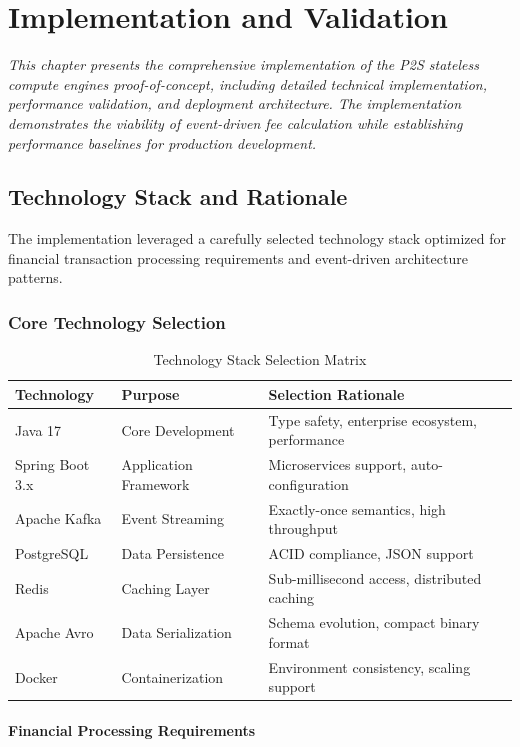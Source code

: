 \chapter{Implementation and Validation}
\textit{This chapter presents the comprehensive implementation of the P2S stateless compute engines proof-of-concept, including detailed technical implementation, performance validation, and deployment architecture. The implementation demonstrates the viability of event-driven fee calculation while establishing performance baselines for production development.}
\pagebreak

\section{Technology Stack and Rationale}

The implementation leveraged a carefully selected technology stack optimized for financial transaction processing requirements and event-driven architecture patterns.

\subsection{Core Technology Selection}

\begin{table}[h]
\centering
\begin{tabular}{|l|l|l|}
\hline
\textbf{Technology} & \textbf{Purpose} & \textbf{Selection Rationale} \\
\hline
Java 17 & Core Development & Type safety, enterprise ecosystem, performance \\
Spring Boot 3.x & Application Framework & Microservices support, auto-configuration \\
Apache Kafka & Event Streaming & Exactly-once semantics, high throughput \\
PostgreSQL & Data Persistence & ACID compliance, JSON support \\
Redis & Caching Layer & Sub-millisecond access, distributed caching \\
Apache Avro & Data Serialization & Schema evolution, compact binary format \\
Docker & Containerization & Environment consistency, scaling support \\
\hline
\end{tabular}
\caption{Technology Stack Selection Matrix}
\end{table}

\subsubsection{Financial Processing Requirements}

